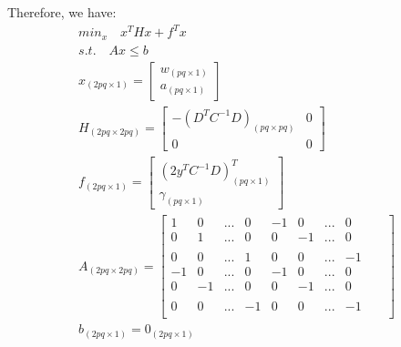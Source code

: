 Therefore, we have:
\begin{align}
 min_x \quad x^THx + f^Tx \\
 s. t. \quad Ax \leq b\\
 x_{(2pq \times 1)}  = \left[ \begin{array}{c} w_{(pq \times 1)}\\ a_{(pq \times 1)} \end{array} \right] \\
 H_{(2pq \times 2pq)} = \left[ \begin{array}{cc} -(D^TC^{-1}D)_{(pq \times pq)} & 0\\0&0\end{array} \right] \\
 f_{(2pq \times 1)} = \left[ \begin{array}{c}{(2y^TC^{-1}D)^T_{(pq \times 1)}}\\\gamma_{(pq \times 1)} \end{array} \right]\\
A_{(2pq \times 2pq)} = \left[ \begin{array}{cccccccccc}1&0&...&0&-1&0&...&0\\0&1&...&0&0&-1&...&0\\&&&&&&&&&\\0&0&...&1&0&0&...&-1\\
-1&0&...&0&-1&0&...&0\\0&-1&...&0&0&-1&...&0\\&&&&&&&&&\\0&0&...&-1&0&0&...&-1\\\end{array}\right]\\
b_{(2pq \times 1)}=0_{(2pq \times 1)}
\end{align}
